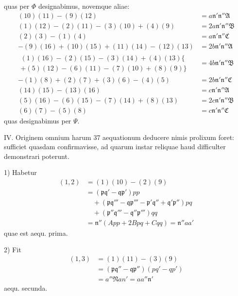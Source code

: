 quas per $\Phi$ designabimus, novemque aliae:
\[
\begin{aligned}
(10)(11)-(9)(12)&=a\mathfrak{n}'\mathfrak{n}''\mathfrak{A}\\
(1)(12)-(2)(11)-(3)(10)+(4)(9)&=2a\mathfrak{n}'\mathfrak{n}''\mathfrak{B}\\
(2)(3)-(1)(4)&=a\mathfrak{n}'\mathfrak{n}''\mathfrak{C}\\
-(9)(16)+(10)(15)+(11)(14)-(12)(13)&=2b\mathfrak{n}'\mathfrak{n}''\mathfrak{A}\\
\begin{gathered}
(1)(16)-(2)(15)-(3)(14)+(4)(13)\{\\
+(5)(12)-(6)(11)-(7)(10)+(8)(9)\}
\end{gathered}&=4b\mathfrak{n}'\mathfrak{n}''\mathfrak{B}\\
-(1)(8)+(2)(7)+(3)(6)-(4)(5)&=2b\mathfrak{n}'\mathfrak{n}''\mathfrak{C}\\
(14)(15)-(13)(16)&=c\mathfrak{n}'\mathfrak{n}''\mathfrak{A}\\
(5)(16)-(6)(15)-(7)(14)+(8)(13)&=2c\mathfrak{n}'\mathfrak{n}''\mathfrak{B}\\
(6)(7)-(5)(8)&=c\mathfrak{n}'\mathfrak{n}''\mathfrak{C}
\end{aligned}
\]
quas designabimus per $\Psi$.

IV. Originem omnium harum 37 aequationum deducere nimis prolixum foret: sufficiet quasdam confirmavisse, ad quarum instar reliquae haud difficulter demonstrari poterunt.

\leavevmode{}
1) Habetur
\[
\begin{aligned}
(1,2)&=(1)(10)-(2)(9)\\
&=(\mathfrak{p}\mathfrak{q}'-\mathfrak{q}\mathfrak{p}')pp\\&\quad+(\mathfrak{p}\mathfrak{q}'''-\mathfrak{q}\mathfrak{p}'''-\mathfrak{p}'\mathfrak{q}''+\mathfrak{q}'\mathfrak{p}'')pq\\&\quad+(\mathfrak{p}''\mathfrak{q}'''-\mathfrak{q}''\mathfrak{p}''')qq\\
&=\mathfrak{n}''(App+2Bpq+Cqq)=\mathfrak{n}''aa'
\end{aligned}
\]
quae est aequ. prima.

2) Fit
\[
\begin{aligned}(1,3)&=(1)(11)-(3)(9)\\&=(\mathfrak{p}\mathfrak{q}''-\mathfrak{q}\mathfrak{p}'')(pq'-qp')\\&=a''\mathfrak{N}an'=aa''\mathfrak{n}'\end{aligned}
\]
aequ. secunda.

